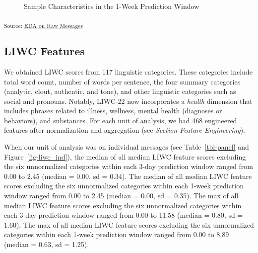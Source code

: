 \documentclass[
  letterpaper,
  DIV=11,
  numbers=noendperiod]{scrartcl}
\begin{document}
\begin{figure}[H]


\caption{\label{fig-1week}Sample Characteristics in the 1-Week
Prediction Window}

\end{figure}%

\textsubscript{Source:
\href{https://jjcurtin.github.io/study_messages/notebooks/fig_eda_messages-preview.html\#cell-fig-1week}{EDA
on Raw Messages}}

\subsection{LIWC Features}\label{liwc-features}

We obtained LIWC scores from 117 linguistic categories. These categories
include total word count, number of words per sentence, the four summary
categories (analytic, clout, authentic, and tone), and other linguistic
categories such as social and pronouns. Notably, LIWC-22 now
incorporates a \emph{health} dimension that includes phrases related to
illness, wellness, mental health (diagnoses or behaviors), and
substances. For each unit of analysis, we had 468 engineered features
after normalization and aggregation (see \emph{Section Feature
Engineering}).

When our unit of analysis was on individual messages (see
Table~\ref{tbl-panel} and Figure~\ref{fig-liwc_ind}), the median of all
median LIWC feature scores excluding the six unnormalized categories
within each 3-day prediction window ranged from 0.00 to 2.45 (median =
0.00, sd = 0.34). The median of all median LIWC feature scores excluding
the six unnormalized categories within each 1-week prediction window
ranged from 0.00 to 2.45 (median = 0.00, sd = 0.35). The max of all
median LIWC feature scores excluding the six unnormalized categories
within each 3-day prediction window ranged from 0.00 to 11.58 (median =
0.80, sd = 1.60). The max of all median LIWC feature scores excluding
the six unnormalized categories within each 1-week prediction window
ranged from 0.00 to 8.89 (median = 0.63, sd = 1.25).
\end{document}
